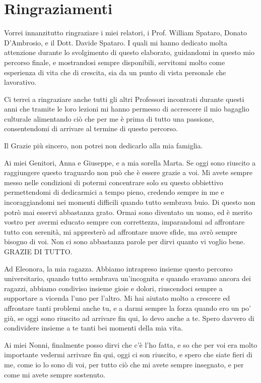 \documentclass[tesi]{subfiles}
\begin{document}
\section*{Ringraziamenti}\label{sc:Ringraziamenti}
Vorrei innanzitutto ringraziare i miei relatori, i Prof. William Spataro, Donato D’Ambrosio, e il Dott. Davide Spataro. I quali mi hanno dedicato molta attenzione durante lo svolgimento di questo elaborato, guidandomi in questo mio percorso finale, e mostrandosi sempre disponibili, servitomi molto come esperienza di vita che di crescita, sia da un punto di vista personale che lavorativo.


Ci terrei a ringraziare anche tutti gli altri Professori incontrati durante questi anni che tramite le loro lezioni mi hanno permesso di accrescere il mio bagaglio culturale alimentando ciò che per me è prima di tutto una passione, consentendomi di arrivare al termine di questo percorso.


Il Grazie più sincero, non potrei non dedicarlo alla mia famiglia.

Ai miei Genitori, Anna e Giuseppe, e a mia sorella Marta. Se oggi sono riuscito a raggiungere questo traguardo non può che è essere grazie a voi. Mi avete sempre messo nelle condizioni di potermi concentrare solo su questo obbiettivo permettendomi di dedicarmici a tempo pieno, credendo sempre in me e incoraggiandomi nei momenti difficili quando tutto sembrava buio. Di questo non potrò mai esservi abbastanza grato. Ormai sono diventato un uomo, ed è merito vostro per avermi educato sempre con correttezza, imparandomi ad affrontare tutto con serenità, mi appresterò ad affrontare nuove sfide, ma avrò sempre bisogno di voi.
Non ci sono abbastanza parole per dirvi quanto vi voglio bene. GRAZIE DI TUTTO.


Ad Eleonora, la mia ragazza. Abbiamo intrapreso insieme questo percorso universitario, quando tutto sembrava un’incognita e quando eravamo ancora dei ragazzi, abbiamo condiviso insieme gioie e dolori, riuscendoci sempre a supportare a vicenda l’uno per l’altro. Mi hai aiutato molto a crescere ed affrontare tanti problemi anche tu, e a darmi sempre la forza quando ero un po’ giù, se oggi sono riuscito ad arrivare fin qui, lo devo anche a te. Spero davvero di condividere insieme a te tanti bei momenti della mia vita.


Ai miei Nonni, finalmente posso dirvi che c’è l’ho fatta, e so che per voi era molto importante vedermi arrivare fin qui, oggi ci son riuscito, e spero che siate fieri di me, come io lo sono di voi, per tutto ciò che mi avete sempre insegnato, e per come mi avete sempre sostenuto.
\end{document}
